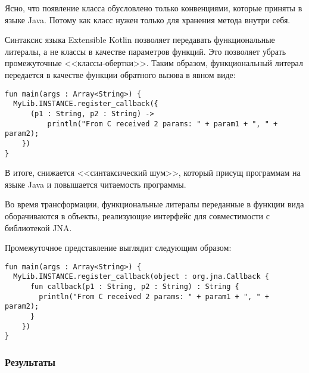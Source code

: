 Ясно, что появление класса  обусловлено только конвенциями, которые приняты в языке Java. Потому как класс нужен только для хранения метода  внутри себя.

Синтаксис языка Extensible Kotlin позволяет передавать функциональные литералы, а не классы в качестве параметров функций. Это позволяет убрать промежуточные <<классы-обертки>>. Таким образом, функциональный литерал передается в качестве функции обратного вызова в явном виде:
\begin{lstlisting}
fun main(args : Array<String>) {
  MyLib.INSTANCE.register_callback({
      (p1 : String, p2 : String) -> 
          println("From C received 2 params: " + param1 + ", " + param2);
    })
}
\end{lstlisting}

В итоге, снижается <<синтаксический шум>>, который присущ программам на языке Java и повышается читаемость программы.

Во время трансформации, функциональные литералы переданные в функции вида  оборачиваются в объекты, реализующие интерфейс  для совместимости с библиотекой JNA.

Промежуточное представление выглядит следующим образом:
\begin{lstlisting}
fun main(args : Array<String>) {
  MyLib.INSTANCE.register_callback(object : org.jna.Callback {
      fun callback(p1 : String, p2 : String) : String {
        println("From C received 2 params: " + param1 + ", " + param2);
      }
    })
}
\end{lstlisting}

\subsubsection{Результаты}